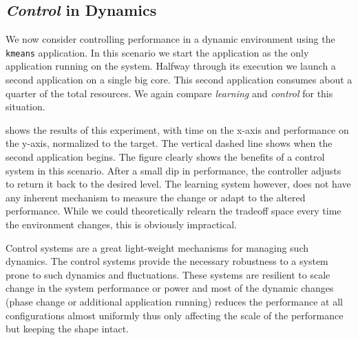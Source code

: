 
\subsection{\emph{Control} in Dynamics}
We now consider controlling performance in a dynamic environment using
the \texttt{kmeans} application.  In this scenario we start the
application as the only application running on the system.  Halfway
through its execution we launch a second application on a single big
core.  This second application consumes about a quarter of the total
resources.  We again compare \emph{learning} and \emph{control} for this situation.


 shows the results of this experiment, with
time on the x-axis and performance on the y-axis, normalized to the
target.  The vertical dashed line shows when the second application
begins.  The figure clearly shows the benefits of a control system in
this scenario.  After a small dip in performance, the controller
adjusts to return it back to the desired level.  The learning system
however, does not have any inherent mechanism to measure the change or
adapt to the altered performance.  While we could theoretically
relearn the tradeoff space every time the environment changes, this is
obviously impractical.  

Control systems are a great light-weight
mechanisms for managing such dynamics. The control systems provide the necessary robustness to a system prone to such dynamics and fluctuations. These systems are resilient to scale change in the system performance or power and most of the dynamic changes (phase change or additional application running) reduces the performance at all configurations almost uniformly thus only affecting the scale of the performance but keeping the shape intact. 

